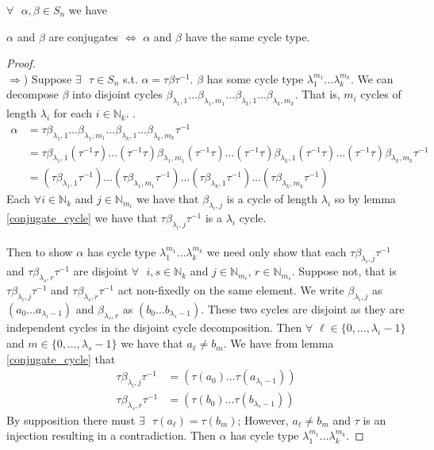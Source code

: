 \begin{theorem}
	\label{conjugate_cycle_type}
	$\forall\text{ }\alpha, \beta \in S_n$ we have
	\begin{center}
		$\alpha$ and $\beta$ are conjugates $\iff$ $\alpha$ and $\beta$
		have the same cycle type.
	\end{center}
\end{theorem}
\begin{proof}
	\text{}\\$\Rightarrow$) Suppose $\exists\text{ }\tau\in S_n$ s.t.
	$\alpha = \tau\beta\tau^{-1}$. $\beta$ has some cycle type
	$\lambda_1^{m_1}\dots\lambda_k^{m_k}$. We can decompose
	$\beta$ into disjoint cycles $\beta_{\lambda_1,
		1}\dots\beta_{\lambda_1, m_1}\dots\beta_{\lambda_k,
		1}\dots\beta_{\lambda_k, m_k}$. That is, $m_i$ cycles of length
	$\lambda_i$ for each $i \in \mathbb{N}_k$. .
		\begin{align*}
			\alpha & = \tau\beta_{\lambda_1, 1}\dots\beta_{\lambda_1,
				m_1}\dots\beta_{\lambda_k, 1}\dots\beta_{\lambda_k, m_k}\tau^{-1}
			\\
			       & = \tau\beta_{\lambda_1,
				1}(\tau^{-1}\tau)\dots(\tau^{-1}\tau)\beta_{\lambda_1,
				m_1}(\tau^{-1}\tau)\dots(\tau^{-1}\tau)\beta_{\lambda_k,
			1}(\tau^{-1}\tau)\dots(\tau^{-1}\tau)\beta_{\lambda_k, m_k}\tau^{-1}      \\
			       & = (\tau\beta_{\lambda_1, 1}\tau^{-1})\dots(\tau\beta_{\lambda_1,
				m_1}\tau^{-1})\dots(\tau\beta_{\lambda_k,
				1}\tau^{-1})\dots(\tau\beta_{\lambda_k, m_k}\tau^{-1})
		\end{align*}
		Each $\forall i \in \mathbb{N}_k$ and $j \in \mathbb{N}_{m_i}$ we
		have that $\beta_{\lambda_i, j}$ is a cycle of length $\lambda_i$ so
		by lemma \ref{conjugate_cycle} we have that $\tau\beta_{\lambda_i,
		j}\tau^{-1}$ is a $\lambda_i$ cycle.
		\\\\Then to show $\alpha$ has cycle type
	$\lambda_1^{m_1}\dots\lambda_k^{m_k}$ we need only show that each
	$\tau\beta_{\lambda_i, j}\tau^{-1}$ and $\tau\beta_{\lambda_s,
		r}\tau^{-1}$ are disjoint $\forall\text{ }i, s\in\mathbb{N}_k$ and
	$j\in\mathbb{N}_{m_i}$, $r\in\mathbb{N}_{m_s}$. Suppose not, that is
	$\tau\beta_{\lambda_i, j}\tau^{-1}$ and $\tau\beta_{\lambda_s,
		r}\tau^{-1}$ act non-fixedly on the same element. We write
	$\beta_{\lambda_i, j}$ as $(a_0\dots a_{\lambda_i-1})$ and
	$\beta_{\lambda_s, r}$ as $(b_0\dots b_{\lambda_s-1})$. These two
		cycles are disjoint as they are independent cycles in the disjoint
		cycle decomposition. Then $\forall\text{
	}\ell\in\{0,\dots,\lambda_i-1\}$ and $m\in\{0,\dots,\lambda_s-1\}$ we
		have that $a_\ell \ne b_m$.
		We have from lemma \ref{conjugate_cycle} that
		\begin{align*}
			\tau\beta_{\lambda_i, j}\tau^{-1} & = (\tau(a_0)\dots\tau(a_{\lambda_i-1})) \\
			\tau\beta_{\lambda_s, r}\tau^{-1} & = (\tau(b_0)\dots\tau(b_{\lambda_s-1}))
		\end{align*}
		By supposition there must $\exists\text{ }\tau(a_\ell) = \tau(b_m)$;
		However, $a_\ell \ne b_m$ and $\tau$ is an injection resulting in a
		contradiction. Then $\alpha$ has cycle type
	$\lambda_1^{m_1}\dots\lambda_k^{m_k}$.


\end{proof}
